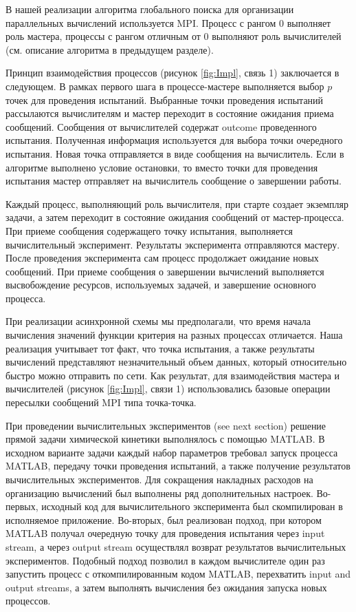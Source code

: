 \documentclass[mathematics,article,submit,pdftex,moreauthors]{Definitions/mdpi}
\begin{document}
В нашей реализации алгоритма глобального поиска для организации параллельных вычислений используется MPI. Процесс с рангом 0 выполняет роль мастера, процессы с рангом отличным от 0 выполняют роль вычислителей (см. описание алгоритма в предыдущем разделе).

Принцип взаимодействия процессов (рисунок \ref{fig:Impl}, связь 1) заключается в следующем. В рамках первого шага в процессе-мастере выполняется выбор $p$ точек для проведения испытаний. Выбранные точки проведения испытаний рассылаются вычислителям и мастер переходит в состояние ожидания приема сообщений. Сообщения от вычислителей содержат outcome проведенного испытания. Полученная информация используется для выбора точки очередного испытания. Новая точка отправляется в виде сообщения на вычислитель. Если в алгоритме выполнено условие остановки, то вместо точки для проведения испытания мастер отправляет на вычислитель сообщение о завершении работы.

Каждый процесс, выполняющий роль вычислителя, при старте создает экземпляр задачи, а затем переходит в состояние ожидания сообщений от мастер-процесса. При приеме сообщения содержащего точку испытания, выполняется вычислительный эксперимент. Результаты эксперимента отправляются мастеру. После проведения эксперимента сам процесс продолжает ожидание новых сообщений. При приеме сообщения о завершении вычислений выполняется высвобождение ресурсов, используемых задачей, и завершение основного процесса.

При реализации асинхронной схемы мы предполагали, что время начала вычисления значений функции критерия на разных процессах отличается. Наша реализация учитывает тот факт, что точка испытания, а также результаты вычислений представляют незначительный объем данных, который относительно быстро можно отправить по сети. Как результат, для взаимодействия мастера и вычислителей (рисунок \ref{fig:Impl}, связи 1) использовались базовые операции пересылки сообщений MPI типа точка-точка. 

При проведении вычислительных экспериментов (see next section) решение прямой задачи химической кинетики выполнялось с помощью MATLAB. В исходном варианте задачи каждый набор параметров требовал запуск процесса MATLAB, передачу точки проведения испытаний, а также получение результатов вычислительных экспериментов. Для сокращения накладных расходов на организацию вычислений был выполнены ряд дополнительных настроек. Во-первых, исходный код для вычислительного эксперимента был скомпилирован в исполняемое приложение. Во-вторых, был реализован подход, при котором MATLAB получал очередную точку для проведения испытания через input stream, а через output stream осуществлял возврат результатов вычислительных экспериментов. Подобный подход позволил в каждом вычислителе один раз запустить процесс с откомпилированным кодом MATLAB, перехватить input and output streams, а затем выполнять вычисления без ожидания запуска новых процессов. 
\end{document}
